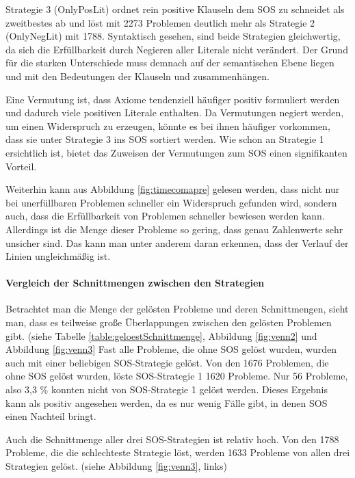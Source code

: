 		Strategie 3 (OnlyPosLit) ordnet rein positive Klauseln dem SOS zu schneidet als zweitbestes ab und löst mit 2273 Problemen deutlich mehr als Strategie 2 (OnlyNegLit) mit 1788. Syntaktisch gesehen, sind beide Strategien gleichwertig, da sich die Erfüllbarkeit durch Negieren aller Literale nicht verändert. Der Grund für die starken Unterschiede muss demnach auf der semantischen Ebene liegen und mit den Bedeutungen der Klauseln und zusammenhängen. 
		
		Eine Vermutung ist, dass Axiome tendenziell häufiger positiv formuliert werden und dadurch viele positiven Literale enthalten. Da Vermutungen negiert werden, um einen Widerspruch zu erzeugen, könnte es bei ihnen häufiger vorkommen, dass sie unter Strategie 3 ins SOS sortiert werden. Wie schon an Strategie 1 ersichtlich ist, bietet das Zuweisen der Vermutungen zum SOS einen signifikanten Vorteil.
	
		Weiterhin kann aus Abbildung \ref{fig:timecomapre} gelesen werden, dass nicht nur bei unerfüllbaren Problemen schneller ein Widerspruch gefunden wird, sondern auch, dass die Erfüllbarkeit von Problemen schneller bewiesen werden kann. Allerdings ist die Menge dieser Probleme so gering, dass genau Zahlenwerte sehr unsicher sind. Das kann man unter anderem daran erkennen, dass der Verlauf der Linien ungleichmäßig ist.
	
		\paragraph{Vergleich der Schnittmengen zwischen den Strategien}
	
		Betrachtet man die Menge der gelösten Probleme und deren Schnittmengen, sieht man, dass es teilweise große Überlappungen zwischen den gelösten Problemen gibt. (siehe Tabelle \ref{table:geloestSchnittmenge}, Abbildung \ref{fig:venn2} und Abbildung \ref{fig:venn3} Fast alle Probleme, die ohne SOS gelöst wurden, wurden auch mit einer beliebigen SOS-Strategie gelöst. 
		Von den 1676 Problemen, die ohne SOS gelöst wurden, löste SOS-Strategie 1 1620 Probleme. Nur 56 Probleme, also 3,3 \% konnten nicht von SOS-Strategie 1 gelöst werden. Dieses Ergebnis kann als positiv angesehen werden, da es nur wenig Fälle gibt, in denen SOS einen Nachteil bringt.
	
		Auch die Schnittmenge aller drei SOS-Strategien ist relativ hoch. Von den 1788 Probleme, die die schlechteste Strategie löst, werden 1633 Probleme von allen drei Strategien gelöst. (siehe Abbildung \ref{fig:venn3}, links) 
		
